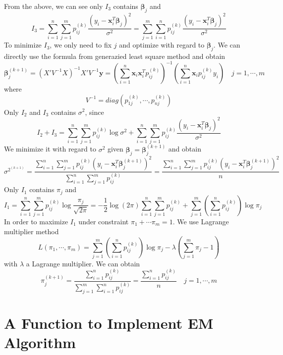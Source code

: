 \documentclass[]{book}
\theoremstyle{definition}
\theoremstyle{definition}
\theoremstyle{definition}
\theoremstyle{remark}
\begin{document}
From the above, we can see only \(I_{3}\) contains
\(\boldsymbol{\beta}_{j}\) and
\[I_{3}=\sum^{n}_{i=1}\sum^{m}_{j=1}p^{(k)}_{ij}\frac{(y_{i}-\mathbf{x}_{i}^{T}\boldsymbol{\beta}_{j})^{2}}{\sigma^{2}}=\sum^{m}_{j=1}\sum^{n}_{i=1}p^{(k)}_{ij}\frac{(y_{i}-\mathbf{x}_{i}^{T}\boldsymbol{\beta}_{j})^{2}}{\sigma^{2}}\]
To minimize \(I_{3}\), we only need to fix \(j\) and optimize with
regard to \(\boldsymbol{\beta}_{j}\). We can directly use the formula
from generazied least square method and obtain
\[\boldsymbol{\beta}_{j}^{(k+1)}=(X'V^{-1}X)^{-1}X'V^{-1}\mathbf{y}=\left(\sum^{n}_{i=1}\mathbf{x}_{i}\mathbf{x}^{T}_{i}p^{(k)}_{ij}\right)^{-1}\left(\sum^{n}_{i=1}\mathbf{x}_{i}p^{(k)}_{ij}y_{i}\right)\quad j=1,\cdots, m\]
where \[V^{-1}=diag(p_{1j}^{(k)},\cdots, p_{nj}^{(k)})\] Only \(I_{2}\)
and \(I_{3}\) contains \(\sigma^{2}\), since
\[I_{2}+I_{3}=\sum^{n}_{i=1}\sum^{m}_{j=1}p^{(k)}_{ij}\log\sigma^{2}+\sum^{n}_{i=1}\sum^{m}_{j=1}p^{(k)}_{ij}\frac{(y_{i}-\mathbf{x}_{i}^{T}\boldsymbol{\beta}_{j})^{2}}{\sigma^{2}}\]
We minimize it with regard to \(\sigma^{2}\) given
\(\boldsymbol{\beta}_{j}=\boldsymbol{\beta}^{(k+1)}_{j}\) and obtain
\[\sigma^{2^{(k+1)}}=\frac{\sum^{n}_{i=1}\sum^{m}_{j=1}p^{(k)}_{ij}(y_{i}-\mathbf{x}_{i}^{T}\boldsymbol{\beta}^{(k+1)}_{j})^{2}}{\sum^{n}_{i=1}\sum^{m}_{j=1}p^{(k)}_{ij}}=\frac{\sum^{n}_{i=1}\sum^{m}_{j=1}p^{(k)}_{ij}(y_{i}-\mathbf{x}_{i}^{T}\boldsymbol{\beta}^{(k+1)}_{j})^{2}}{n}\]
Only \(I_{1}\) contains \(\pi_{j}\) and
\[I_{1}=\sum^{n}_{i=1}\sum^{m}_{j=1}p^{(k)}_{ij}\log\frac{\pi_{j}}{\sqrt{2\pi}}=-\frac{1}{2}\log(2\pi)\sum^{n}_{i=1}\sum^{m}_{j=1}p^{(k)}_{ij}+\sum^{m}_{j=1}\left(\sum^{n}_{i=1}p^{(k)}_{ij}\right)\log\pi_{j}\]
In order to maximize \(I_{1}\) under constraint
\(\pi_{1}+\cdots\pi_{m}=1\). We use Lagrange multiplier method
\[L(\pi_{1},\cdots,\pi_{m})=\sum^{m}_{j=1}\left(\sum^{n}_{i=1}p^{(k)}_{ij}\right)\log\pi_{j}-\lambda\left(\sum^{m}_{j=1}\pi_{j}-1\right)\]
with \(\lambda\) a Lagrange multiplier. We can obtain
\[\pi^{(k+1)}_{j}=\frac{\sum^{n}_{i=1}p^{(k)}_{ij}}{\sum^{m}_{j=1}\sum^{n}_{i=1}p^{(k)}_{ij}}=\frac{\sum^{n}_{i=1}p^{(k)}_{ij}}{n}\quad j=1,\cdots,m\]

\section{A Function to Implement EM
Algorithm}\label{a-function-to-implement-em-algorithm}
\end{document}
